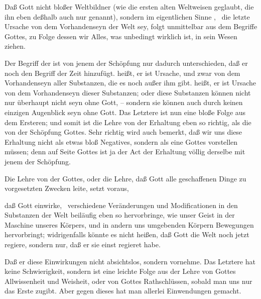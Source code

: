 \begin{aufza}
\begin{aufzb}
\end{aufzb}
\item Daß Gott nicht bloßer Weltbildner (wie die ersten alten Weltweisen geglaubt, die ihn eben deßhalb auch nur  genannt), sondern im eigentlichen Sinne , \dh\ die letzte Ursache von dem Vorhandenseyn der Welt sey, folgt unmittelbar aus dem Begriffe Gottes, zu Folge dessen wir Alles, was unbedingt wirklich ist, in sein Wesen ziehen.
\item Der Begriff der  ist von jenem der Schöpfung nur dadurch unterschieden, daß er noch den Begriff der Zeit hinzufügt.  heißt, er ist Ursache, und zwar  von dem Vorhandenseyn aller Substanzen, die es noch außer ihm gibt.  heißt, er ist  Ursache von dem Vorhandenseyn dieser Substanzen; oder diese Substanzen können nicht nur überhaupt nicht seyn ohne Gott, -- sondern sie können auch durch keinen einzigen Augenblick seyn ohne Gott. Das Letztere ist nun eine bloße Folge aus dem Ersteren; und somit ist die Lehre von der Erhaltung eben so richtig, als die von der Schöpfung Gottes. Sehr richtig wird auch bemerkt, daß wir uns diese Erhaltung nicht als etwas bloß Negatives, sondern als eine  Gottes vorstellen müssen; denn auf Seite Gottes ist ja der Act der Erhaltung völlig derselbe mit jenem der Schöpfung.
\item Die Lehre von der  Gottes, oder die Lehre, daß Gott alle geschaffenen Dinge zu vorgesetzten Zwecken leite, setzt voraus,
\begin{aufzb}
\item daß Gott  einwirke, \dh\ verschiedene Veränderungen und Modificationen in den Substanzen der Welt beiläufig eben so hervorbringe, wie unser Geist in der Maschine unseres Körpers, und in andern uns umgebenden Körpern Bewegungen hervorbringt; widrigenfalls könnte es nicht heißen, daß Gott die Welt noch jetzt regiere, sondern nur, daß er sie einst regieret habe.
\item Daß er diese Einwirkungen nicht absichtslos, sondern  vornehme. Das Letztere hat keine Schwierigkeit, sondern ist eine leichte Folge aus der Lehre von Gottes Allwissenheit und Weisheit, oder von Gottes Rathschlüssen, sobald man uns nur das Erste zugibt. Aber gegen dieses hat man allerlei Einwendungen gemacht.
\end{aufzb}\end{aufza}\par
